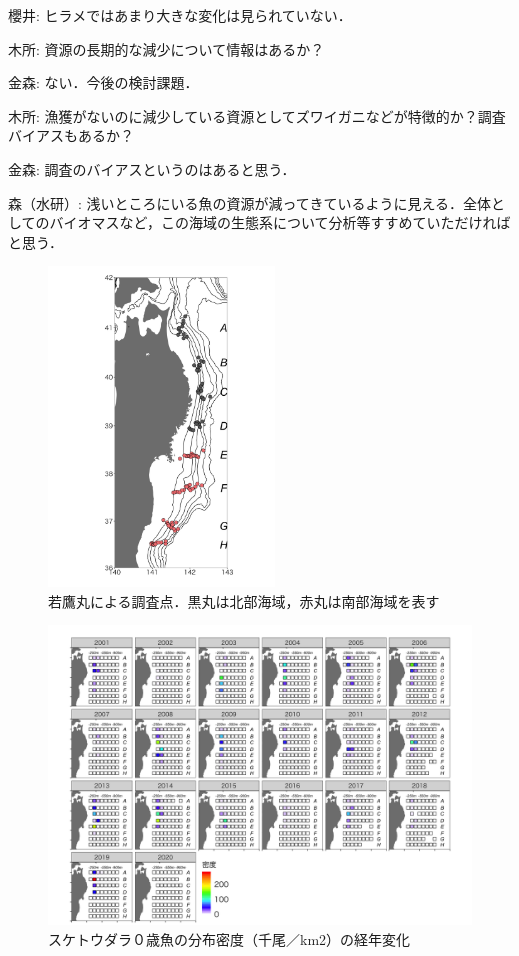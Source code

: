 \documentclass[11pt]{article} %
\begin{document}
\begin{linenumbers}
櫻井: ヒラメではあまり大きな変化は見られていない．

木所: 資源の長期的な減少について情報はあるか？  

金森: ない．今後の検討課題．

木所: 漁獲がないのに減少している資源としてズワイガニなどが特徴的か？調査バイアスもあるか？

金森: 調査のバイアスというのはあると思う．

森（水研）: 浅いところにいる魚の資源が減ってきているように見える．全体としてのバイオマスなど，この海域の生態系について分析等すすめていただければと思う．

\begin{figure}[h]
  \centering
  \includegraphics[width = 6cm]{fig1.png}
  \caption{若鷹丸による調査点．黒丸は北部海域，赤丸は南部海域を表す}
\end{figure}

\begin{figure}[h]
  \centering
  \includegraphics[width = 14cm]{スケトウダラ０＋dens.png}
  \caption{スケトウダラ０歳魚の分布密度（千尾／km2）の経年変化}
\end{figure}


\end{linenumbers}
\end{document}
